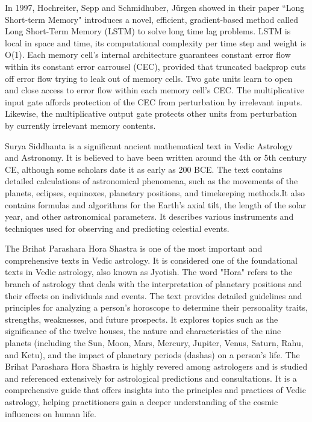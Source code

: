 In 1997, Hochreiter, Sepp and Schmidhuber, Jürgen showed in their paper ``Long Short-term Memory" introduces a novel, efficient, gradient-based method called Long Short-Term Memory (LSTM) to solve long time lag problems. LSTM is local in space and time, its computational complexity per time step and weight is O(1). Each memory cell's internal architecture guarantees constant error flow within its constant error carrousel (CEC), provided that truncated backprop cuts off error flow trying to leak out of memory cells. Two gate units learn to open and close access to error flow within each memory cell's CEC. The multiplicative input gate affords protection of the CEC from perturbation by irrelevant inputs. Likewise, the multiplicative output gate protects other units from perturbation by currently irrelevant memory contents\cite{article}.
\vspace{1\baselineskip}

Surya Siddhanta is a significant ancient mathematical text in Vedic Astrology and Astronomy. It is believed to have been written around the 4th or 5th century CE, although some scholars date it as early as 200 BCE. The text contains detailed calculations of astronomical phenomena, such as the movements of the planets, eclipses, equinoxes, planetary positions, and timekeeping methods.It also contains formulas and algorithms for the Earth's axial tilt, the length of the solar year, and other astronomical parameters. It describes various instruments and techniques used for observing and predicting celestial events\cite{SuryaSiddhanta, wiki:ss}.
\vspace{1\baselineskip}

The Brihat Parashara Hora Shastra is one of the most important and comprehensive texts in Vedic astrology. It is considered one of the foundational texts in Vedic astrology, also known as Jyotish. The word "Hora" refers to the branch of astrology that deals with the interpretation of planetary positions and their effects on individuals and events. The text provides detailed guidelines and principles for analyzing a person's horoscope to determine their personality traits, strengths, weaknesses, and future prospects. It explores topics such as the significance of the twelve houses, the nature and characteristics of the nine planets (including the Sun, Moon, Mars, Mercury, Jupiter, Venus, Saturn, Rahu, and Ketu), and the impact of planetary periods (dashas) on a person's life. The Brihat Parashara Hora Shastra is highly revered among astrologers and is studied and referenced extensively for astrological predictions and consultations. It is a comprehensive guide that offers insights into the principles and practices of Vedic astrology, helping practitioners gain a deeper understanding of the cosmic influences on human life\cite{BrihatParasharHoraShastraVol1,BrihatParasharHoraShastraVol2, wiki:bphs}.
\vspace{1\baselineskip}

